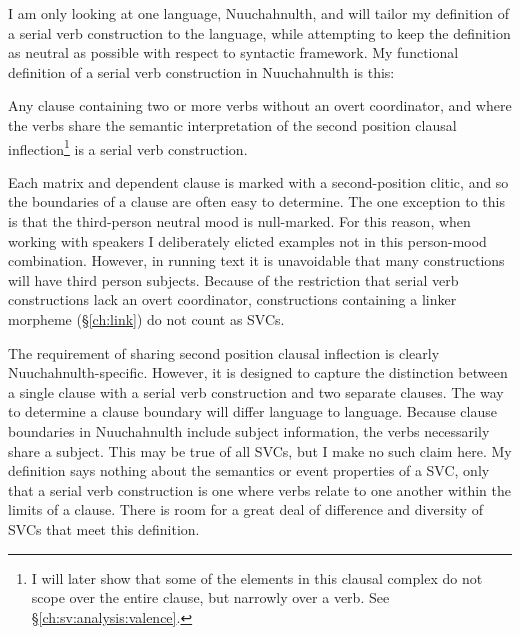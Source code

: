 I am only looking at one language, Nuuchahnulth, and will tailor my definition of a serial verb construction to the language, while attempting to keep the definition as neutral as possible with respect to syntactic framework.
My functional definition of a serial verb construction in Nuuchahnulth is this:

\ex \label{svcdef}
Any clause containing two or more verbs without an overt coordinator, and where the verbs share the semantic interpretation of the second position clausal inflection\footnote{I will later show that some of the elements in this clausal complex do not scope over the entire clause, but narrowly over a verb. See \S\ref{ch:sv:analysis:valence}.} is a serial verb construction.
\xe

Each matrix and dependent clause is marked with a second-position clitic, and so the boundaries of a clause are often easy to determine. The one exception to this is that the third-person neutral mood is null-marked. For this reason, when working with speakers I deliberately elicted examples not in this person-mood combination. However, in running text it is unavoidable that many constructions will have third person subjects. Because of the restriction that serial verb constructions lack an overt coordinator, constructions containing a linker morpheme (\S\ref{ch:link}) do not count as SVCs.

The requirement of sharing second position clausal inflection is clearly Nuuchahnulth-specific. However, it is designed to capture the distinction between a single clause with a serial verb construction and two separate clauses. The way to determine a clause boundary will differ language to language. Because clause boundaries in Nuuchahnulth include subject information, the verbs necessarily share a subject. This may be true of all SVCs, but I make no such claim here. My definition says nothing about the semantics or event properties of a SVC, only that a serial verb construction is one where verbs relate to one another within the limits of a clause. There is room for a great deal of difference and diversity of SVCs that meet this definition.%


